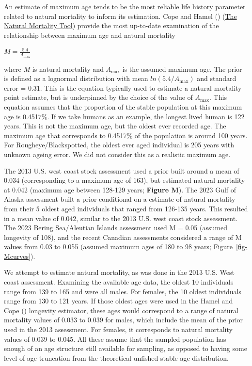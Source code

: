 \documentclass[
]{scrartcl}
\begin{document}
An estimate of maximum age tends to be the most reliable life history
parameter related to natural mortality to inform its estimation. Cope
and Hamel ()
(\href{https://connect.fisheries.noaa.gov/natural-mortality-tool/}{The
Natural Mortality Tool}) provide the most up-to-date examination of the
relationship between maximum age and natural mortality

\begin{centering}

$M=\frac{5.4}{A_{\text{max}}}$

\end{centering}

\vspace{0.5cm}

where \(M\) is natural mortality and \({A_{\text{max}}}\) is the assumed
maximum age. The prior is defined as a lognormal distribution with mean
\(ln(5.4/A_{\text{max}})\) and standard error = 0.31. This is the
equation typically used to estimate a natural mortality point estimate,
but is underpinned by the choice of the value of \({A_{\text{max}}}\).
This equation assumes that the proportion of the stable population at
this maximum age is 0.4517\%. If we take humans as an example, the
longest lived human is 122 years. This is not the maximum age, but the
oldest ever recorded age. The maximum age that corresponds to 0.4517\%
of the population is around 100 years. For Rougheye/Blackspotted, the
oldest ever aged individual is 205 years with unknown ageing error. We
did not consider this as a realistic maximum age.

The 2013 U.S. west coast stock assessment used a prior built around a
mean of 0.034 (corresponding to a maximum age of 163), but estimated
natural mortality at 0.042 (maximum age between 128-129 years;
\textbf{Figure M}). The 2023 Gulf of Alaska assessment built a prior
conditional on a estimate of natural mortality from their 5 oldest aged
individuals that ranged from 126-135 years. This resulted in a mean
value of 0.042, similar to the 2013 U.S. west coast stock assessment.
The 2023 Bering Sea/Aleutian Islands assessment used M = 0.05 (assumed
longevity of 108), and the recent Canadian assessments considered a
range of M values from 0.03 to 0.055 (assumed maximum ages of 180 to 98
years; Figure~\ref{fig-Mcurves}).

We attempt to estimate natural mortality, as was done in the 2013 U.S.
West coast assessment. Examining the available age data, the oldest 10
individuals range from 139 to 165 and were all males. For females, the
10 oldest individuals range from 130 to 121 years. If those oldest ages
were used in the Hamel and Cope
() longevity estimator, these
ages would correspond to a range of natural mortality values of 0.033 to
0.039 for males, which include the mean of the prior used in the 2013
assessment. For females, it corresponds to natural mortality values of
0.039 to 0.045. All these assume that the sampled population has enough
of an age structure still available for sampling, as opposed to having
some level of age truncation from the theoretical unfished stable age
distribution.
\end{document}
